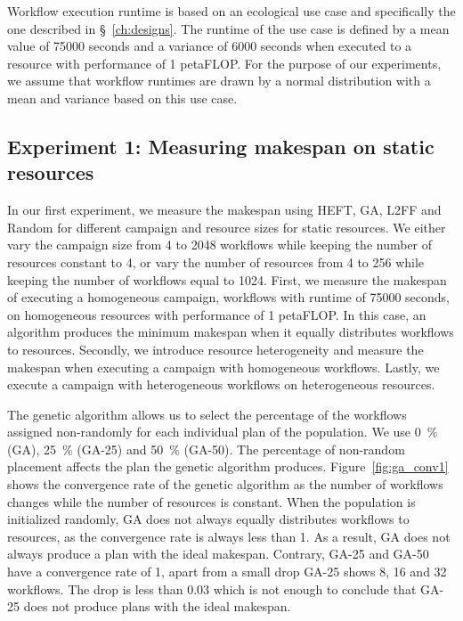 Workflow execution runtime is based on an ecological use case and specifically the one described in \S~\ref{ch:designs}.
The runtime of the use case is defined by a mean value of 75000 seconds and a variance of 6000 seconds when executed to a resource with performance of 1 petaFLOP.
For the purpose of our experiments, we assume that workflow runtimes are drawn by a normal distribution with a mean and variance based on this use case.

\subsection{Experiment 1: Measuring makespan on static resources}

In our first experiment, we measure the makespan using HEFT, GA, L2FF and Random for different campaign and resource sizes for static resources.
We either vary the campaign size from 4 to 2048 workflows while keeping the number of resources constant to 4, or vary the number of resources from 4 to 256 while keeping the number of workflows equal to 1024.
First, we measure the makespan of executing a homogeneous campaign, workflows with runtime of 75000 seconds, on homogeneous resources with performance of 1 petaFLOP.
In this case, an algorithm produces the minimum makespan when it equally distributes workflows to resources.
Secondly, we introduce resource heterogeneity and measure the makespan when executing a campaign with homogeneous workflows.
Lastly, we execute a campaign with heterogeneous workflows on heterogeneous resources.

The genetic algorithm allows us to select the percentage of the workflows assigned non-randomly for each individual plan of the population.
We use 0~\% (GA), 25~\% (GA-25) and 50~\% (GA-50).
The percentage of non-random placement affects the plan the genetic algorithm produces.
Figure~\ref{fig:ga_conv1} shows the convergence rate of the genetic algorithm as the number of workflows changes while the number of resources is constant.
When the population is initialized randomly, GA does not always equally distributes workflows to resources, as the convergence rate is always less than 1.
As a result, GA does not always produce a plan with the ideal makespan.
Contrary, GA-25 and GA-50 have a convergence rate of 1, apart from a small drop GA-25 shows 8, 16 and 32 workflows.
The drop is less than 0.03 which is not enough to conclude that GA-25 does not produce plans with the ideal makespan.

